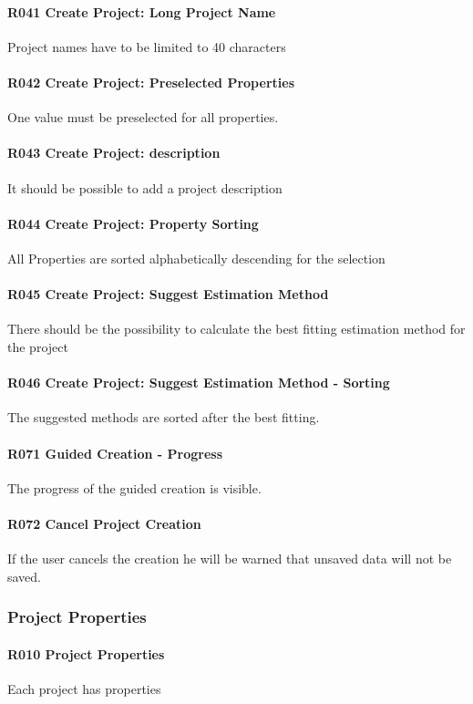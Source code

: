 \paragraph{R041 Create Project: Long Project Name}
Project names have to be limited to 40 characters
\paragraph{R042 Create Project: Preselected Properties}
One value must be preselected for all properties.
\paragraph{R043 Create Project: description}
It should be possible to add a project description
\paragraph{R044 Create Project: Property Sorting}
All Properties are sorted alphabetically descending for the selection
\paragraph{R045 Create Project: Suggest Estimation Method}
There should be the possibility to calculate the best fitting estimation method for the project
\paragraph{R046 Create Project: Suggest Estimation Method - Sorting}
The suggested methods are sorted after the best fitting.
\paragraph{R071 Guided Creation - Progress}
The progress of the guided creation is visible.
\paragraph{R072 Cancel Project Creation}
If the user cancels the creation he will be warned that unsaved data will not be saved.

\subsubsection{Project Properties}
\paragraph{R010 Project Properties}
Each project has properties
